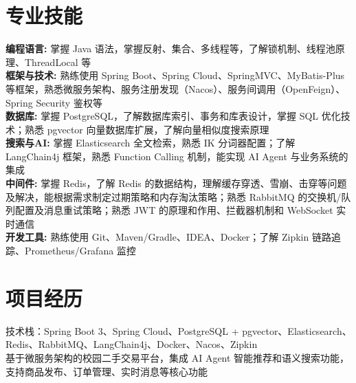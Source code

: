 \section{专业技能}

\textbf{编程语言:} 掌握 Java 语法，掌握反射、集合、多线程等，了解锁机制、线程池原理、ThreadLocal 等\\

\textbf{框架与技术:} 熟练使用 Spring Boot、Spring Cloud、SpringMVC、MyBatis-Plus 等框架，熟悉微服务架构、服务注册发现（Nacos）、服务间调用（OpenFeign）、Spring Security 鉴权等\\

\textbf{数据库:} 掌握 PostgreSQL，了解数据库索引、事务和库表设计，掌握 SQL 优化技术；熟悉 pgvector 向量数据库扩展，了解向量相似度搜索原理\\

\textbf{搜索与AI:} 掌握 Elasticsearch 全文检索，熟悉 IK 分词器配置；了解 LangChain4j 框架，熟悉 Function Calling 机制，能实现 AI Agent 与业务系统的集成\\

\textbf{中间件:} 掌握 Redis，了解 Redis 的数据结构，理解缓存穿透、雪崩、击穿等问题及解决，能根据需求制定过期策略和内存淘汰策略；熟悉 RabbitMQ 的交换机/队列配置及消息重试策略；熟悉 JWT 的原理和作用、拦截器机制和 WebSocket 实时通信\\

\textbf{开发工具:} 熟练使用 Git、Maven/Gradle、IDEA、Docker；了解 Zipkin 链路追踪、Prometheus/Grafana 监控

\section{项目经历}


技术栈：Spring Boot 3、Spring Cloud、PostgreSQL + pgvector、Elasticsearch、Redis、RabbitMQ、LangChain4j、Docker、Nacos、Zipkin\\

基于微服务架构的校园二手交易平台，集成 AI Agent 智能推荐和语义搜索功能，支持商品发布、订单管理、实时消息等核心功能

